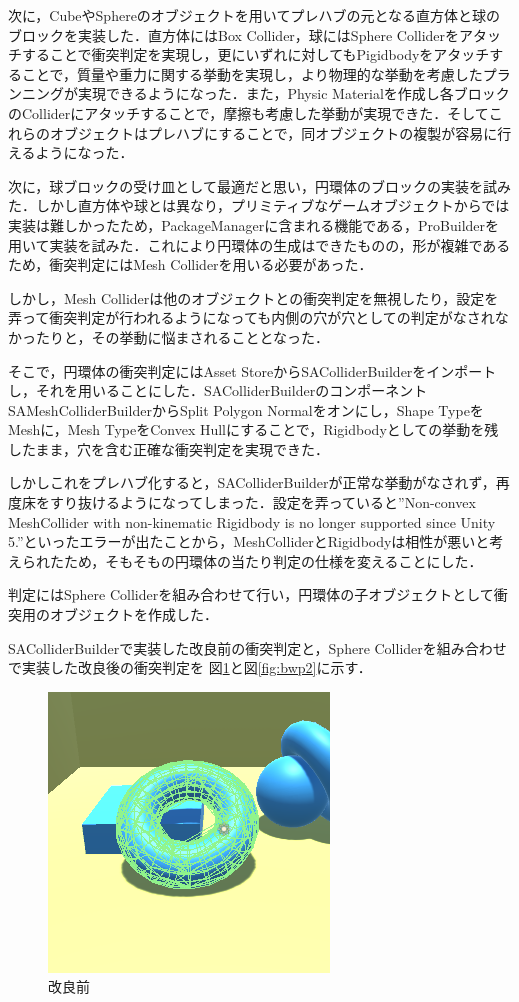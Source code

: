 \documentclass[uplatex,12pt]{jsarticle}
\begin{document}
次に，CubeやSphereのオブジェクトを用いてプレハブの元となる直方体と球のブロックを実装した．直方体にはBox Collider，球にはSphere Colliderをアタッチすることで衝突判定を実現し，更にいずれに対してもPigidbodyをアタッチすることで，質量や重力に関する挙動を実現し，より物理的な挙動を考慮したプランニングが実現できるようになった．また，Physic Materialを作成し各ブロックのColliderにアタッチすることで，摩擦も考慮した挙動が実現できた．そしてこれらのオブジェクトはプレハブにすることで，同オブジェクトの複製が容易に行えるようになった．

次に，球ブロックの受け皿として最適だと思い，円環体のブロックの実装を試みた．しかし直方体や球とは異なり，プリミティブなゲームオブジェクトからでは実装は難しかったため，PackageManagerに含まれる機能である，ProBuilderを用いて実装を試みた．これにより円環体の生成はできたものの，形が複雑であるため，衝突判定にはMesh Colliderを用いる必要があった．

しかし，Mesh Colliderは他のオブジェクトとの衝突判定を無視したり，設定を弄って衝突判定が行われるようになっても内側の穴が穴としての判定がなされなかったりと，その挙動に悩まされることとなった．

そこで，円環体の衝突判定にはAsset StoreからSAColliderBuilderをインポートし，それを用いることにした．SAColliderBuilderのコンポーネントSAMeshColliderBuilderからSplit Polygon Normalをオンにし，Shape TypeをMeshに，Mesh TypeをConvex Hullにすることで，Rigidbodyとしての挙動を残したまま，穴を含む正確な衝突判定を実現できた．

しかしこれをプレハブ化すると，SAColliderBuilderが正常な挙動がなされず，再度床をすり抜けるようになってしまった．設定を弄っていると''Non-convex MeshCollider with non-kinematic Rigidbody is no longer supported since Unity 5.''といったエラーが出たことから，MeshColliderとRigidbodyは相性が悪いと考えられたため，そもそもの円環体の当たり判定の仕様を変えることにした．

判定にはSphere Colliderを組み合わせて行い，円環体の子オブジェクトとして衝突用のオブジェクトを作成した．

SAColliderBuilderで実装した改良前の衝突判定と，Sphere Colliderを組み合わせで実装した改良後の衝突判定を
図\ref{fig:bwp1}と図\ref{fig:bwp2}に示す．

\begin{figure}[!hbt]
  	\begin{center}
  		\includegraphics[scale=0.55]{images/bwp1.png}
	\end{center}
  	\caption{改良前}
  	\label{fig:bwp1}
\end{figure}
\end{document}
